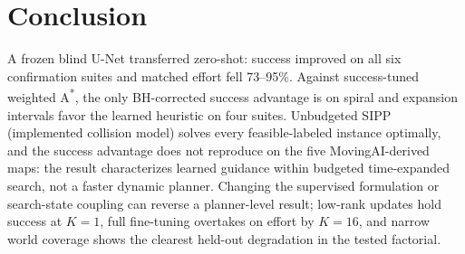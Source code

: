 \documentclass[letterpaper]{article} %
\begin{document}
\section{Conclusion}

A frozen blind U-Net transferred zero-shot: success improved on all six confirmation suites and matched effort fell 73--95\%. Against success-tuned weighted A\textsuperscript{*}, the only BH-corrected success advantage is on spiral and expansion intervals favor the learned heuristic on four suites. Unbudgeted SIPP (implemented collision model) solves every feasible-labeled instance optimally, and the success advantage does not reproduce on the five MovingAI-derived maps: the result characterizes learned guidance within budgeted time-expanded search, not a faster dynamic planner. Changing the supervised formulation or search-state coupling can reverse a planner-level result; low-rank updates hold success at $K{=}1$, full fine-tuning overtakes on effort by $K{=}16$, and narrow world coverage shows the clearest held-out degradation in the tested factorial.



\end{document}
